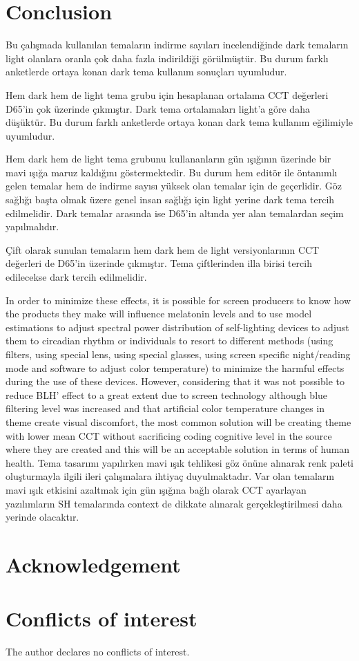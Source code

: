 \documentclass{article}
\begin{document}
\section{Conclusion}
Bu çalışmada kullanılan temaların indirme sayıları incelendiğinde dark temaların light olanlara oranla çok daha fazla indirildiği görülmüştür. Bu durum farklı anketlerde ortaya konan dark tema kullanım sonuçları uyumludur.

Hem dark hem de light tema grubu için hesaplanan ortalama CCT değerleri D65'in çok üzerinde çıkmıştır. Dark tema ortalamaları light'a göre daha düşüktür. Bu durum farklı anketlerde ortaya konan dark tema kullanım eğilimiyle uyumludur.

Hem dark hem de light tema grubunu kullananların gün ışığının üzerinde bir mavi ışığa maruz kaldığını göstermektedir. Bu
durum hem editör ile öntanımlı gelen temalar hem de indirme sayısı yüksek olan temalar için de geçerlidir. Göz sağlığı
başta olmak üzere genel insan sağlığı için light yerine dark tema tercih edilmelidir. Dark temalar arasında ise D65'in
altında yer alan temalardan seçim yapılmalıdır.

Çift olarak sunulan temaların hem dark hem de light versiyonlarının CCT değerleri de D65'in üzerinde çıkmıştır. Tema çiftlerinden illa birisi tercih edilecekse dark tercih edilmelidir.

In order to minimize these effects, it is possible for screen producers to know how the  products they make will influence melatonin levels and to use model estimations to adjust spectral power distribution of self-lighting devices to adjust them to circadian rhythm or individuals to resort to different methods (using filters, using special lens, using special glasses, using screen specific night/reading mode and software to adjust color temperature) to minimize the harmful effects during the use of these devices. However, considering that it was not possible to reduce BLH' effect to a great extent due to screen technology although blue filtering level was increased and that artificial color temperature changes in theme create visual discomfort, the most common solution will be creating theme with lower mean CCT without sacrificing coding cognitive level in the source where they are created and this will be an acceptable solution in terms of human health. Tema tasarımı yapılırken mavi ışık tehlikesi göz önüne alınarak renk paleti oluşturmayla ilgili ileri çalışmalara ihtiyaç duyulmaktadır. Var olan temaların mavi ışık etkisini azaltmak için gün ışığına bağlı olarak CCT ayarlayan yazılımların SH temalarında context de dikkate alınarak gerçekleştirilmesi daha yerinde olacaktır.

\section*{Acknowledgement}
\section*{Conflicts of interest}
The author declares no conflicts of interest.



\end{document}

